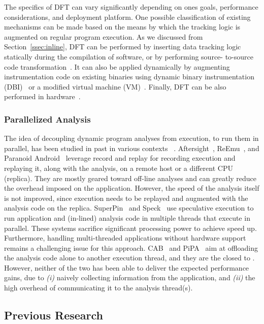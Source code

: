 The specifics of DFT can vary significantly depending on ones goals,
performance considerations, and deployment platform. One possible
classification of existing mechanisms can be made based on the means by which
the tracking logic is augmented on regular program execution. As we discussed
from Section~\ref{ssec:inline}, DFT can be performed by inserting data tracking
logic statically during the compilation of software, or by performing source-
to-source code transformation~\cite{}. It can also be applied dynamically by
augmenting instrumentation code on existing binaries using dynamic binary
instrumentation (DBI)~\cite{}  or a modified virtual machine (VM)~\cite{}.
Finally, DFT can be also performed in hardware~\cite{}.

\subsubsection{Parallelized Analysis}
\label{ssec:parallel}

The idea of decoupling dynamic program analyses from execution, to run them in
parallel, has been studied in past in various contexts~\cite{} . 
%
Aftersight~\cite{}, ReEmu~\cite{}, and Paranoid Android~\cite{} leverage record
and replay for recording execution and replaying it, along with the analysis,
on a remote host or a different CPU (replica). They are mostly geared toward
off-line analyses and can greatly reduce the overhead imposed on the
application.  However, the speed of the analysis itself is not improved, since
execution needs to be replayed and augmented with the analysis code on the
replica.  SuperPin~\cite{} and Speck~\cite{} use speculative execution to run
application and (in-lined) analysis code in multiple threads that execute in
parallel. These systems sacrifice significant processing power to achieve speed
up.  Furthermore, handling multi-threaded applications without hardware support
remains a challenging issue for this approach. CAB~\cite{} and PiPA~\cite{} aim
at offloading the analysis code alone to another execution thread, and they are
the closed to \sreplica. However, neither of the two has been able to deliver
the expected performance gains, due to {\it (i)} naively collecting information
from the application, and {\it (ii)} the high overhead of communicating it to
the analysis thread(s). 

\subsection{Previous Research}

